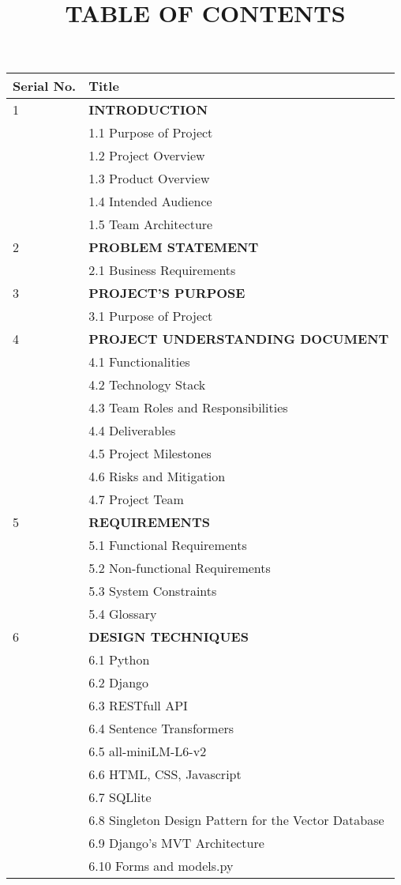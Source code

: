 \documentclass[10pt]{article}
\title{\vspace{4ex}\textbf{TABLE OF CONTENTS}\vspace{-8ex}}
\date{}
\begin{document}
\maketitle
\begin{longtable}{ll}
	\hline
	\textbf{Serial No.} & \textbf{Title} \\ \hline

	\multirow{1}{*}{1} & \textbf{INTRODUCTION}\\ 
	& 1.1 Purpose of Project\\
	& 1.2 Project Overview\\
	& 1.3 Product Overview\\
	& 1.4 Intended Audience\\
	& 1.5 Team Architecture\\ \hline

	\multirow{1}{*}{2} & \textbf{PROBLEM STATEMENT}\\ 
	& 2.1 Business Requirements\\\hline

	\multirow{1}{*}{3} & \textbf{PROJECT'S PURPOSE}\\ 
	& 3.1 Purpose of Project\\\hline

	\multirow{1}{*}{4} & \textbf{PROJECT UNDERSTANDING DOCUMENT}\\ 
	& 4.1 Functionalities\\
	& 4.2 Technology Stack\\
	& 4.3 Team Roles and Responsibilities\\
	& 4.4 Deliverables\\
	& 4.5 Project Milestones\\
	& 4.6 Risks and Mitigation\\
	& 4.7 Project Team\\ \hline

	\multirow{1}{*}{5} & \textbf{REQUIREMENTS}\\ 
	& 5.1 Functional Requirements\\
	& 5.2 Non-functional Requirements\\
	& 5.3 System Constraints\\
	& 5.4 Glossary\\ \hline

	\multirow{1}{*}{6} & \textbf{DESIGN TECHNIQUES}\\ 
	& 6.1 Python\\
	& 6.2 Django\\
	& 6.3 RESTfull API\\
	& 6.4 Sentence Transformers\\
	& 6.5 all-miniLM-L6-v2\\
	& 6.6 HTML, CSS, Javascript\\
	& 6.7 SQLlite\\ 
	& 6.8 Singleton Design Pattern for the Vector Database\\
	& 6.9 Django's MVT Architecture\\
	& 6.10 Forms and models.py\\ \hline


\end{longtable}
\end{document}
